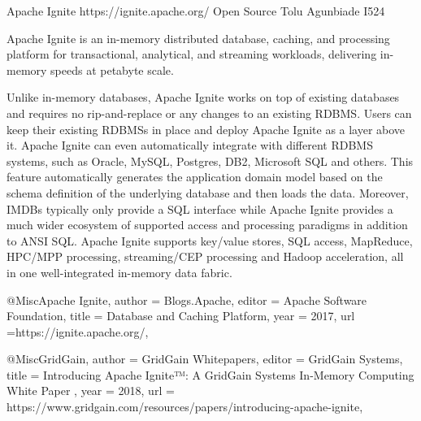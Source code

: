Apache Ignite 
https://ignite.apache.org/ 
Open Source 
Tolu Agunbiade 
I524

Apache Ignite is an in-memory distributed database, caching, and processing
platform for transactional, analytical, and streaming workloads, delivering
in-memory speeds at petabyte scale\cite{Apache Ignite}.

Unlike in-memory databases, Apache Ignite works on top of existing databases and
requires no rip-and-replace or any changes to an existing RDBMS. Users can keep
their existing RDBMSs in place and deploy Apache Ignite as a layer above it.
Apache Ignite can even automatically integrate with different RDBMS systems,
such as Oracle, MySQL, Postgres, DB2, Microsoft SQL and others. This feature
automatically generates the application domain model based on the schema
definition of the underlying database and then loads the data. Moreover, IMDBs
typically only provide a SQL interface while Apache Ignite provides a much wider
ecosystem of supported access and processing paradigms in addition to ANSI SQL.
Apache Ignite supports key/value stores, SQL access, MapReduce, HPC/MPP
processing, streaming/CEP processing and Hadoop acceleration, all in one
well-integrated in-memory data fabric\cite{GridGain}.


@Misc{Apache Ignite, 
author = {Blogs.Apache}, 
editor = {Apache Software Foundation}, 
title = {Database and Caching Platform}, 
year = {2017}, 
url ={https://ignite.apache.org/}, 
}


@Misc{GridGain, 
author = {GridGain Whitepapers}, 
editor = {GridGain Systems},
title = {Introducing Apache Ignite™: A GridGain Systems In-Memory Computing White Paper }, 
year = {2018}, 
url = {https://www.gridgain.com/resources/papers/introducing-apache-ignite}, 
}
